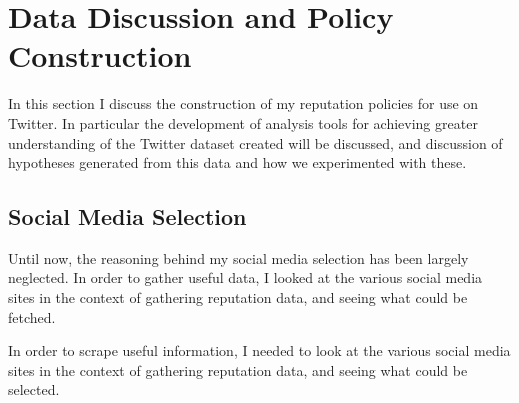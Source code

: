 \chapter{Data Discussion and Policy Construction}\label{C:us}

In this section I discuss the construction of my reputation policies for use on Twitter. In particular the development of analysis tools for achieving greater understanding of the Twitter dataset created will be discussed, and discussion of hypotheses generated from this data and how we experimented with these. %

\section{Social Media Selection}

Until now, the reasoning behind my social media selection has been largely neglected. In order to gather useful data, I looked at the various social media sites in the context of gathering reputation data, and seeing what could be fetched. %

In order to scrape useful information, I needed to look at the various social media sites in the context of gathering reputation data, and seeing what could be selected. 

